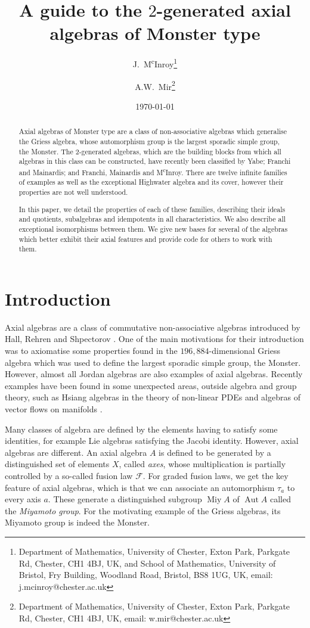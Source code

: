 \documentclass[11pt, a4paper]{article}
\title{A guide to the $2$-generated axial algebras of Monster type}
\author{J.~M\textsuperscript{c}Inroy\footnote{Department of Mathematics, University of Chester, Exton Park, Parkgate Rd, Chester, CH1 4BJ, UK, and School of Mathematics, University of Bristol, Fry Building, Woodland Road, Bristol, BS8 1UG, UK, email: j.mcinroy@chester.ac.uk}
\and
A.W.~Mir\footnote{Department of Mathematics, University of Chester, Exton Park, Parkgate Rd, Chester, CH1 4BJ, UK, email: w.mir@chester.ac.uk}
 }
\date{\today}
\theoremstyle{plain}
\theoremstyle{definition}
\newcommand\cF{\mathcal{F}}
\DeclareMathOperator{\Aut}{Aut}
\DeclareMathOperator{\Miy}{Miy}
\newcommand{\0}{\overline{0}}
\newcommand{\2}{\overline{2}}
\newcommand{\1}{\mathbbm{1}}
\begin{document}
\maketitle

\begin{abstract}
Axial algebras of Monster type are a class of non-associative algebras which generalise the Griess algebra, whose automorphism group is the largest sporadic simple group, the Monster.  The $2$-generated algebras, which are the building blocks from which all algebras in this class can be constructed, have recently been classified by Yabe; Franchi and Mainardis; and Franchi, Mainardis and M\textsuperscript{c}Inroy.  There are twelve infinite families of examples as well as the exceptional Highwater algebra and its cover, however their properties are not well understood.

In this paper, we detail the properties of each of these families, describing their ideals and quotients, subalgebras and idempotents in all characteristics.  We also describe all exceptional isomorphisms between them.  We give new bases for several of the algebras which better exhibit their axial features and provide code for others to work with them.
\end{abstract}

\section{Introduction}

Axial algebras are a class of commutative non-associative algebras introduced by Hall, Rehren and Shpectorov \cite{Axial1}.  One of the main motivations for their introduction was to axiomatise some properties found in the $196,884$-dimensional Griess algebra which was used to define the largest sporadic simple group, the Monster.  However, almost all Jordan algebras are also examples of axial algebras.  Recently examples have been found in some unexpected areas, outside algebra and group theory, such as Hsiang algebras in the theory of non-linear PDEs \cite{Tkachev} and algebras of vector flows on manifolds \cite{Fox}.

Many classes of algebra are defined by the elements having to satisfy some identities, for example Lie algebras satisfying the Jacobi identity.  However, axial algebras are different.  An axial algebra $A$ is defined to be generated by a distinguished set of elements $X$, called \emph{axes}, whose multiplication is partially controlled by a so-called fusion law $\cF$.  For graded fusion laws, we get the key feature of axial algebras, which is that we can associate an automorphism $\tau_a$ to every axis $a$.  These generate a distinguished subgroup $\Miy A$ of $\Aut A$ called the \emph{Miyamoto group}.  For the motivating example of the Griess algebras, its Miyamoto group is indeed the Monster.
\end{document}
